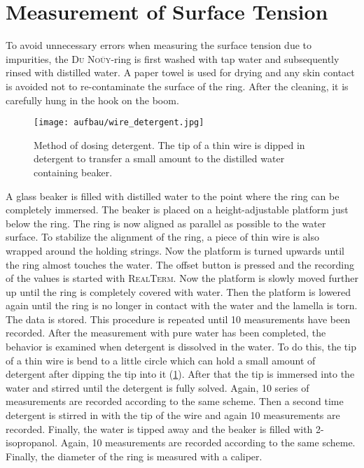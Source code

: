     \section{Measurement of Surface Tension} \label{sec:Surface_Tension}
        To avoid unnecessary errors when measuring the surface tension due to impurities, the \textsc{Du Noüy}-ring is first washed with tap
        water and subsequently rinsed with distilled water. A paper towel is used for drying and any skin contact is avoided
        not to re-contaminate the surface of the ring. After the cleaning, it is carefully hung in the hook on the boom.\par
        \begin{figure}[h]
		    \centering
		    \texttt{[image: aufbau/wire\_detergent.jpg]}
		    \caption[Method of dosing detergent]{Method of dosing detergent. The tip of a thin wire is dipped in detergent to transfer a small amount to the distilled water containing beaker.}
		    \label{fig:wire_detergent}
	    \end{figure}
        A glass beaker is filled with distilled water to the point where the ring can be
        completely immersed. The beaker is placed on a height-adjustable platform just below the ring. The ring is now aligned as
        parallel as possible to the water surface. To stabilize the alignment of the ring, a piece of thin wire is also wrapped
        around the holding strings. Now the platform is turned upwards until the ring almost touches the water. The offset button
        is pressed and the recording of the values is started with \textsc{RealTerm}. Now the platform is slowly moved further up
        until the ring is completely covered with water. Then the platform is lowered again until the ring is no longer in contact
        with the water and the lamella is torn. The data is stored. This procedure is repeated until 10 measurements have been
        recorded. After the measurement with pure water has been completed, the behavior is examined when detergent is dissolved
        in the water. To do this, the tip of a thin wire is bend to a little circle which can hold a small amount of detergent
        after dipping the tip into it (\cref{fig:wire_detergent}). After that the tip is immersed into the water and stirred until the detergent is fully
        solved. Again, 10 series of measurements are recorded according to the same scheme. Then a second time detergent is stirred
        in with the tip of the wire and again 10 measurements are recorded. Finally, the water is tipped away and the beaker is
        filled with 2-isopropanol. Again, 10 measurements are recorded according to the same scheme. Finally, the diameter of the
        ring is measured with a caliper.
